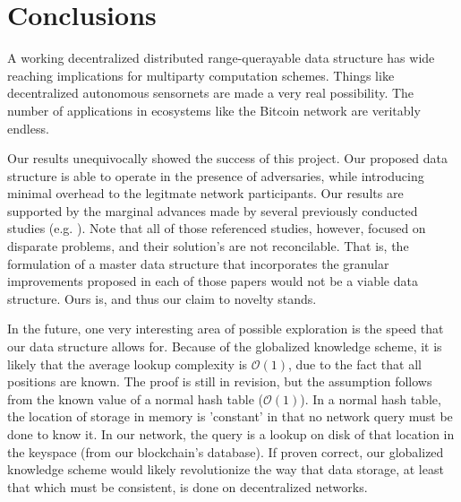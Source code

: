 \documentclass[10pt]{IEEEtran}
\begin{document}
\section{Conclusions}
\par A working decentralized distributed range-querayable data structure has wide reaching implications for multiparty computation schemes. Things like decentralized autonomous sensornets are made a very real possibility. The number of applications in ecosystems like the Bitcoin network are veritably endless.

\par Our results unequivocally showed the success of this project. Our proposed data structure is able to operate in the presence of adversaries, while introducing minimal overhead to the legitmate network participants. Our results are supported by the marginal advances made by several previously conducted studies (e.g. \cite{forestiero2009self,Freitas:2013tb,LesniewskiLass:2010ue}). Note that all of those referenced studies, however, focused on disparate problems, and their solution's are not reconcilable. That is, the formulation of a master data structure that incorporates the granular improvements proposed in each of those papers would not be a viable data structure. Ours is, and thus our claim to novelty stands.

\par In the future, one very interesting area of possible exploration is the speed that our data structure allows for. Because of the globalized knowledge scheme, it is likely that the average lookup complexity is $\mathcal{O}(1)$, due to the fact that all positions are known. The proof is still in revision, but the assumption follows from the known value of a normal hash table ($\mathcal{O}(1)$). In a normal hash table, the location of storage in memory is 'constant' in that no network query must be done to know it. In our network, the query is a lookup on disk of that location in the keyspace (from our blockchain's database). If proven correct, our globalized knowledge scheme would likely revolutionize the way that data storage, at least that which must be consistent, is done on decentralized networks. 




\printbibliography
\end{document}
